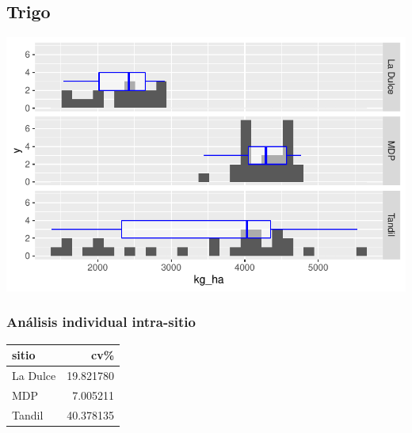 \documentclass[
  letterpaper,
  DIV=11,
  numbers=noendperiod]{scrartcl}
\begin{document}
\hypertarget{trigo-1}{%
\subsection{Trigo}\label{trigo-1}}

\includegraphics{curasem_files/figure-pdf/unnamed-chunk-24-1.pdf}

\hypertarget{anuxe1lisis-individual-intra-sitio-1}{%
\subsubsection{Análisis individual
intra-sitio}\label{anuxe1lisis-individual-intra-sitio-1}}

\begin{longtable}[]{@{}lr@{}}
\toprule()
sitio & cv\% \\
\midrule()
\endhead
La Dulce & 19.821780 \\
MDP & 7.005211 \\
Tandil & 40.378135 \\
\bottomrule()
\end{longtable}
\end{document}
